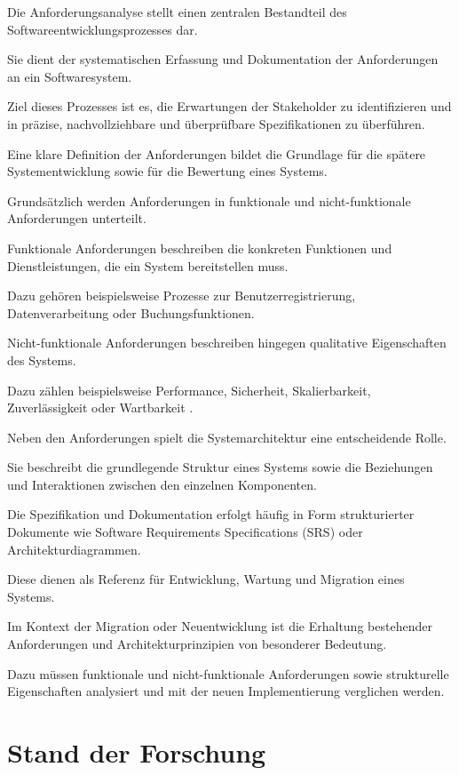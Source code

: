 Die Anforderungsanalyse stellt einen zentralen
Bestandteil des Softwareentwicklungsprozesses dar.

Sie dient der systematischen Erfassung und
Dokumentation der Anforderungen an ein
Softwaresystem.

Ziel dieses Prozesses ist es, die Erwartungen der
Stakeholder zu identifizieren und in präzise,
nachvollziehbare und überprüfbare Spezifikationen zu
überführen.

Eine klare Definition der Anforderungen bildet die
Grundlage für die spätere Systementwicklung sowie für
die Bewertung eines Systems.

Grundsätzlich werden Anforderungen in funktionale und
nicht-funktionale Anforderungen unterteilt.

Funktionale Anforderungen beschreiben die konkreten
Funktionen und Dienstleistungen, die ein System
bereitstellen muss.

Dazu gehören beispielsweise Prozesse zur
Benutzerregistrierung, Datenverarbeitung oder
Buchungsfunktionen.

Nicht-funktionale Anforderungen beschreiben hingegen
qualitative Eigenschaften des Systems.

Dazu zählen beispielsweise Performance, Sicherheit,
Skalierbarkeit, Zuverlässigkeit oder Wartbarkeit
\cite{leucker2024anforderungen}.

Neben den Anforderungen spielt die Systemarchitektur
eine entscheidende Rolle.

Sie beschreibt die grundlegende Struktur eines Systems
sowie die Beziehungen und Interaktionen zwischen den
einzelnen Komponenten.

Die Spezifikation und Dokumentation erfolgt häufig in
Form strukturierter Dokumente wie Software
Requirements Specifications (SRS) oder
Architekturdiagrammen.

Diese dienen als Referenz für Entwicklung, Wartung und
Migration eines Systems.

Im Kontext der Migration oder Neuentwicklung ist die
Erhaltung bestehender Anforderungen und
Architekturprinzipien von besonderer Bedeutung.

Dazu müssen funktionale und nicht-funktionale
Anforderungen sowie strukturelle Eigenschaften
analysiert und mit der neuen Implementierung
verglichen werden.

\section{Stand der Forschung}


